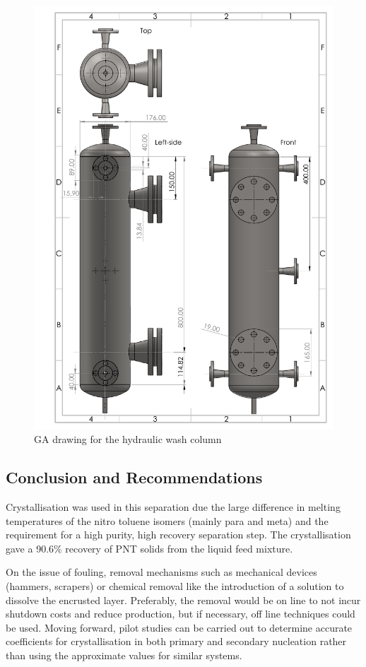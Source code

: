 \newpage
\begin{figure}[h!]
    \centering
    \includegraphics[scale=0.8]{chapters/3-separation/figures/Hydraulic_Wash_Column_GA.PDF}
    \caption{GA drawing for the hydraulic wash column}
    \label{fig:wash column GA}
\end{figure} 

\newpage

\subsection{Conclusion and Recommendations}

Crystallisation was used in this separation due the large difference in melting temperatures of the nitro toluene isomers (mainly para and meta) and the requirement for a high purity, high recovery separation step. The crystallisation gave a 90.6\% recovery of PNT solids from the liquid feed mixture. 



On the issue of fouling, removal mechanisms such as mechanical devices (hammers, scrapers) or chemical removal like the introduction of a solution to dissolve the encrusted layer. Preferably, the removal would be on line to not incur shutdown costs and reduce production, but if necessary, off line techniques could be used.
Moving forward, pilot studies can be carried out to determine accurate coefficients for crystallisation in both primary and secondary nucleation rather than using the approximate values for similar systems. 





